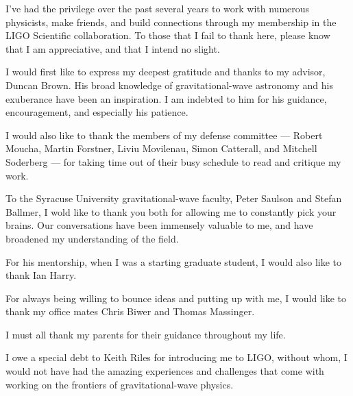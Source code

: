 I've had the privilege over the past several years to work with numerous physicists,
make friends, and build connections through my membership in the LIGO Scientific
collaboration. To those that I fail to thank here, please know that I am appreciative,
and that I intend no slight. 

\noindent I would first like to express my deepest gratitude and thanks to my advisor,
Duncan Brown. His broad knowledge of gravitational-wave astronomy and his
exuberance have been an inspiration. I am indebted to him for his
guidance, encouragement, and especially his patience.

\noindent I would also like to thank the members of my defense committee --- Robert Moucha,
Martin Forstner, Liviu Movilenau, Simon Catterall, and Mitchell Soderberg --- 
for taking time out of their busy schedule to read and critique my work.

\noindent To the Syracuse University gravitational-wave faculty, Peter Saulson 
and Stefan Ballmer, I wold like to thank you both for allowing me to constantly 
pick your brains. Our conversations have been immensely valuable to me, and have
broadened my understanding of the field.

\noindent For his mentorship, when I was a starting graduate student, I would
also like to thank Ian Harry. 

\noindent For always being willing to bounce ideas and putting up with me, I
would like to thank my office mates Chris Biwer and Thomas Massinger.

\noindent I must all thank my parents for their guidance throughout my life.

\noindent I owe a special debt to Keith Riles for introducing me to LIGO,
without whom, I would not have had the amazing experiences and challenges that
come with working on the frontiers of gravitational-wave physics. 
